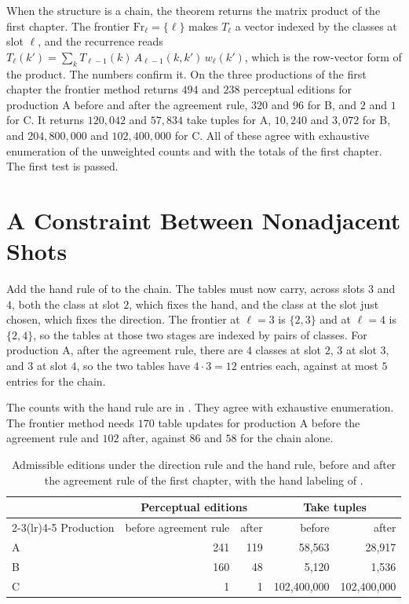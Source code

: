\documentclass[11pt,twoside,openright]{book}
\theoremstyle{plain}
\theoremstyle{definition}
\theoremstyle{remark}
\newcommand{\Fr}{\mathrm{Fr}}
\begin{document}
When the structure is a chain, the theorem returns the matrix product of the first chapter. The frontier $\Fr_\ell=\{\ell\}$ makes $T_\ell$ a vector indexed by the classes at slot $\ell$, and the recurrence reads $T_\ell(k')=\sum_kT_{\ell-1}(k)\,A_{\ell-1}(k,k')\,w_\ell(k')$, which is the row-vector form of the product. The numbers confirm it. On the three productions of the first chapter the frontier method returns $494$ and $238$ perceptual editions for production A before and after the agreement rule, $320$ and $96$ for B, and $2$ and $1$ for C. It returns $120{,}042$ and $57{,}834$ take tuples for A, $10{,}240$ and $3{,}072$ for B, and $204{,}800{,}000$ and $102{,}400{,}000$ for C. All of these agree with exhaustive enumeration of the unweighted counts and with the totals of the first chapter. The first test is passed.

\section{A Constraint Between Nonadjacent Shots}\label{sec:glass}

Add the hand rule of  to the chain. The tables must now carry, across slots $3$ and $4$, both the class at slot $2$, which fixes the hand, and the class at the slot just chosen, which fixes the direction. The frontier at $\ell=3$ is $\{2,3\}$ and at $\ell=4$ is $\{2,4\}$, so the tables at those two stages are indexed by pairs of classes. For production A, after the agreement rule, there are $4$ classes at slot $2$, $3$ at slot $3$, and $3$ at slot $4$, so the two tables have $4\cdot3=12$ entries each, against at most $5$ entries for the chain.

The counts with the hand rule are in . They agree with exhaustive enumeration. The frontier method needs $170$ table updates for production A before the agreement rule and $102$ after, against $86$ and $58$ for the chain alone.

\begin{table}[ht]
\centering
\begin{tabular}{@{}lrrrr@{}}
\toprule
 & \multicolumn{2}{c}{Perceptual editions} & \multicolumn{2}{c}{Take tuples}\\
\cmidrule(lr){2-3}\cmidrule(lr){4-5}
Production & before agreement rule & after & before & after\\
\midrule
A & 241 & 119 & 58,563 & 28,917\\
B & 160 & 48 & 5,120 & 1,536\\
C & 1 & 1 & 102,400,000 & 102,400,000\\
\bottomrule
\end{tabular}
\caption{Admissible editions under the direction rule and the hand rule, before and after the agreement rule of the first chapter, with the hand labeling of .}\label{tab:glasscounts}
\end{table}
\end{document}
